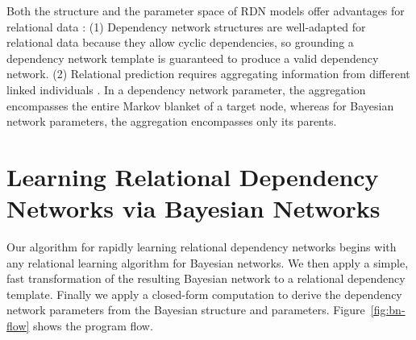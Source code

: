 \documentclass[runningheads,a4paper]{llncs}
\newcommand{\fixneeded}[1]{\textbf{[\footnotesize #1]}}
\newcommand{\iid}{i.i.d.}
\begin{document}
\noindent Both the structure and the parameter space of RDN models offer advantages for relational data \cite{Neville2007,Natarajan2012}: (1) Dependency network structures are well-adapted for relational data because they allow cyclic dependencies, so grounding a dependency network template is guaranteed to produce a valid dependency network.
%
(2) Relational prediction  requires aggregating information from different linked individuals \cite{Natarajan2008}. 
In a dependency network parameter, the aggregation encompasses the entire Markov blanket of a target node, whereas for Bayesian network parameters, the aggregation encompasses only its parents.
%

\section{Learning Relational Dependency Networks via Bayesian Networks}
Our algorithm for rapidly learning relational dependency networks
begins with any relational learning algorithm for Bayesian networks. We then apply a simple, fast transformation of the resulting Bayesian network to a relational dependency template. Finally we apply a closed-form computation to derive the dependency network parameters from the Bayesian structure and parameters. Figure~\ref{fig:bn-flow} shows the program flow. 
\end{document}
